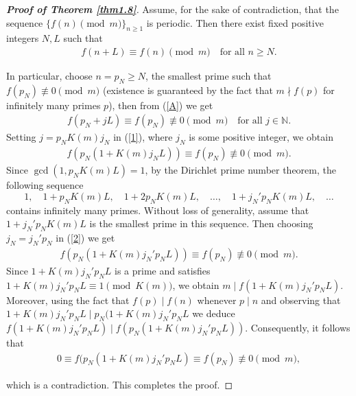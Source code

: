 \documentclass[10pt,a4paper]{amsart}
\begin{document}
\begin{proof}[\textbf{Proof of Theorem \ref{thm1.8}}]
Assume, for the sake of contradiction, that the sequence $\{f(n) \pmod{m}\}_{n\geq 1}$ is periodic. Then there exist fixed positive integers $N,L$ such that
\begin{align}\label{A}
f(n+L)\equiv f(n) \pmod{m}\quad \text{for all~}n\geq N.    
\end{align}

In particular, choose $n=p_N\geq N$, the smallest prime such that $f(p_N)\not\equiv 0\pmod{m}$  (existence is guaranteed by the fact that $m\nmid f(p)$ for infinitely many primes $p$), then from (\ref{A}) we get
\begin{align}\label{1}
f(p_N+jL)\equiv f(p_N)\not\equiv 0\pmod{m}\quad \text{for all~}j\in\mathbb{N}.    
\end{align}
Setting $j=p_NK(m)j_N$ in (\ref{1}), where $j_N$ is some positive integer, we obtain
\begin{align}\label{2}
f(p_N(1+K(m)j_NL))\equiv f(p_N)\not\equiv 0\pmod{m}.    
\end{align}
Since $\gcd(1,p_NK(m)L)=1$, by the Dirichlet prime number theorem, the following sequence
$$1, \quad 1+p_NK(m)L, \quad 1+2p_NK(m)L,\quad \ldots,\quad 1+j_N'p_NK(m)L,\quad \ldots$$
contains infinitely many primes. Without loss of generality, assume that $1+j_N'p_NK(m)L$ is the smallest prime in this sequence. Then choosing $j_N=j_N'p_N$ in (\ref{2}) we get
\begin{align}\label{eq3}
f(p_N(1+K(m)j_N'p_NL))\equiv f(p_N)\not\equiv 0\pmod{m}.    
\end{align}
Since $1+K(m)j_N'p_NL$ is a prime and satisfies $1+K(m)j_N'p_NL\equiv 1 \pmod{K(m)}$, we obtain  $m\mid f(1+K(m)j_N'p_NL)$. Moreover, using the fact that $f(p)\mid f(n)$ whenever $p\mid n$ and observing that $1+K(m)j_N'p_NL\mid p_N(1+K(m)j_N'p_NL$ we deduce  $f(1+K(m)j_N'p_NL)\mid f(p_N(1+K(m)j_N'p_NL))$. Consequently, it follows that
\begin{align}\label{1*}
 0\equiv f(p_N(1+K(m)j_N'p_NL)\equiv f(p_N)\not\equiv 0\pmod{m},   
\end{align}

which is a contradiction. This completes the proof.
\end{proof}
\end{document}
